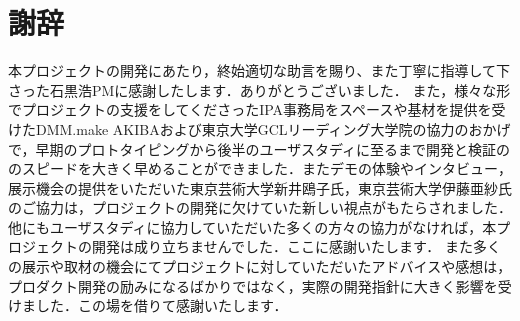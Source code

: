 \section{謝辞}
本プロジェクトの開発にあたり，終始適切な助言を賜り、また丁寧に指導して下さった石黒浩PMに感謝したします．ありがとうございました．
また，様々な形でプロジェクトの支援をしてくださったIPA事務局をスペースや基材を提供を受けたDMM.make AKIBAおよび東京大学GCLリーディング大学院の協力のおかげで，早期のプロトタイピングから後半のユーザスタディに至るまで開発と検証ののスピードを大きく早めることができました．またデモの体験やインタビュー，展示機会の提供をいただいた東京芸術大学新井鴎子氏，東京芸術大学伊藤亜紗氏のご協力は，プロジェクトの開発に欠けていた新しい視点がもたらされました．
他にもユーザスタディに協力していただいた多くの方々の協力がなければ，本プロジェクトの開発は成り立ちませんでした．ここに感謝いたします．
また多くの展示や取材の機会にてプロジェクトに対していただいたアドバイスや感想は，プロダクト開発の励みになるばかりではなく，実際の開発指針に大きく影響を受けました．この場を借りて感謝いたします．

